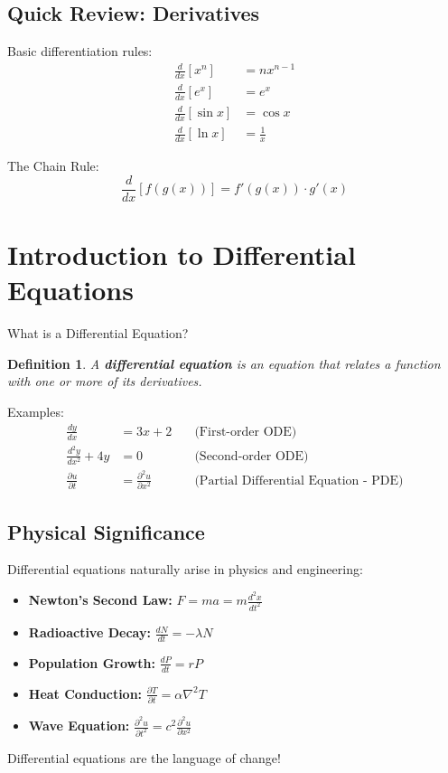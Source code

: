 \documentclass[12pt, letterpaper]{book}
\begin{document}
\subsection{Quick Review: Derivatives}
\label{ssec:derivatives_review}
Basic differentiation rules:
\begin{align}
    \frac{d}{dx}[x^n] &= nx^{n-1} \label{eq:power_rule}\\
    \frac{d}{dx}[e^x] &= e^x \label{eq:exp_rule}\\
    \frac{d}{dx}[\sin x] &= \cos x \label{eq:sin_rule}\\
    \frac{d}{dx}[\ln x] &= \frac{1}{x} \label{eq:ln_rule}
\end{align}

The Chain Rule:
\begin{equation}
    \frac{d}{dx}[f(g(x))] = f'(g(x)) \cdot g'(x) \label{eq:chain_rule}
\end{equation}

\section{Introduction to Differential Equations}
\label{sec:intro_diff_eq}

What is a Differential Equation?
\newtheorem{definition}{Definition}[chapter] %
\begin{definition}
    A \textbf{differential equation} is an equation that relates a function with one or more of its derivatives.
\end{definition}

Examples:
\begin{align}
    \frac{dy}{dx} &= 3x + 2 \quad &\text{(First-order ODE)} \label{eq:ex_first_order}\\
    \frac{d^2y}{dx^2} + 4y &= 0 \quad &\text{(Second-order ODE)} \label{eq:ex_second_order}\\
    \frac{\partial u}{\partial t} &= \frac{\partial^2 u}{\partial x^2} \quad &\text{(Partial Differential Equation - PDE)} \label{eq:ex_pde}
\end{align}

\subsection{Physical Significance}
\label{ssec:physical_significance}
Differential equations naturally arise in physics and engineering:
\begin{itemize}
    \item \textbf{Newton's Second Law:} $F = ma = m\frac{d^2x}{dt^2}$
    \item \textbf{Radioactive Decay:} $\frac{dN}{dt} = -\lambda N$
    \item \textbf{Population Growth:} $\frac{dP}{dt} = rP$
    \item \textbf{Heat Conduction:} $\frac{\partial T}{\partial t} = \alpha \nabla^2 T$
    \item \textbf{Wave Equation:} $\frac{\partial^2 u}{\partial t^2} = c^2 \frac{\partial^2 u}{\partial x^2}$
\end{itemize}
Differential equations are the language of change!
\end{document}
